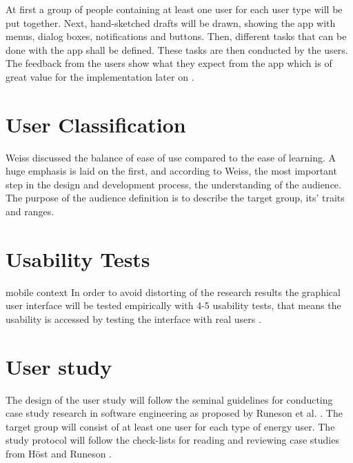 At first a group of people containing at least one user for each user type will be put together.  Next, hand-sketched drafts will be drawn, showing the app with menus, dialog boxes, notifications and buttons. Then, different tasks that can be done with the app shall be defined. These tasks are then conducted by the users. The feedback from the users show what they expect from the app which is of great value for the implementation later on \cite{snyder2003paper}.




\section{User Classification}


Weiss \cite{weiss2003handheld} discussed the balance of ease of use compared to the ease of learning. A huge emphasis is laid on the first, and according to Weiss, the most important step in the design and development process, the understanding of the audience. The purpose of the audience definition is to describe the target group, its' traits and ranges.







\section{Usability Tests} mobile context
In order to avoid distorting of the research results the graphical user interface will be tested empirically with 4-5 usability tests, that means the usability is accessed by testing the interface with real users \cite{nielsen1994usability}.

\section{User study}
The design of the user study will follow the seminal guidelines for conducting case study research in software engineering as proposed by Runeson et al. \cite{runeson2012case}. The target group will consist of at least one user for each type of energy user. The study protocol will follow the check-lists for reading and reviewing case studies from H\"ost and Runeson \cite{host2007checklists}.

